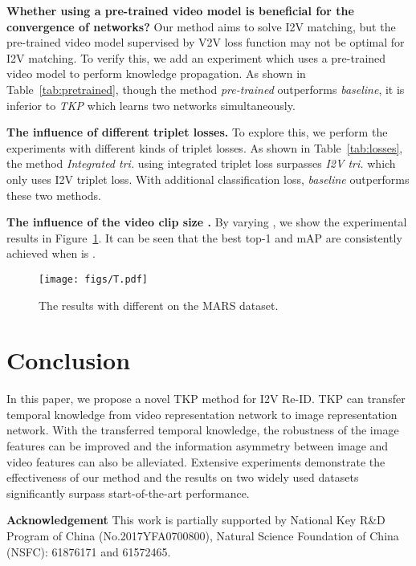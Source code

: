 \documentclass[10pt,twocolumn,letterpaper]{article}
\begin{document}
\vspace{5pt}
\noindent
{\bf Whether using a pre-trained video model is beneficial for the convergence of networks?}
Our method aims to solve I2V matching, but the pre-trained video model supervised by V2V loss function may not be optimal for I2V matching.
To verify this, we add an experiment which uses a pre-trained video model to perform knowledge propagation.
As shown in Table~\ref{tab:pretrained}, though the method \textit{pre-trained} outperforms \textit{baseline}, it is inferior to \textit{TKP} which learns two networks simultaneously.

\vspace{5pt}
\noindent
{\bf The influence of different triplet losses.}
To explore this, we perform the experiments with different kinds of triplet losses.
As shown in Table~\ref{tab:losses}, the method \textit{Integrated tri.} using integrated triplet loss surpasses \textit{I2V tri.} which only uses I2V triplet loss.
With additional classification loss, \textit{baseline} outperforms these two methods.

\vspace{5pt}
\noindent
{\bf The influence of the video clip size .}
By varying , we show the experimental results in Figure~\ref{fig:T}.
It can be seen that the best top-1 and mAP are consistently achieved when  is .

\begin{figure}[t]
	\centering
	\texttt{[image: figs/T.pdf]}
	\vspace{-25pt}
	\caption{The results with different  on the MARS dataset.}
	\vspace{-15pt}
	\label{fig:T}
\end{figure}

\section{Conclusion}

In this paper, we propose a novel TKP method for I2V Re-ID. 
TKP can transfer temporal knowledge from video representation network to image representation network.
With the transferred temporal knowledge, the robustness of the image features can be improved and the information asymmetry between image and video features can also be alleviated.
Extensive experiments demonstrate the effectiveness of our method and the results on two widely used datasets significantly surpass start-of-the-art performance.

\vspace{3pt}
\noindent
{\bf Acknowledgement} This work is partially supported by National Key R\&D Program of China (No.2017YFA0700800), Natural Science Foundation of China (NSFC): 61876171 and 61572465.

{\small


}
\end{document}
